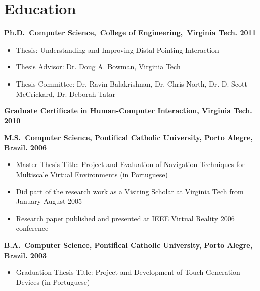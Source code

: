\documentclass[wideaddress]{vitae}
\newcommand{\VT}{Virginia Tech}
\begin{document}
\section{Education}
\begin{description}
	\item{\textbf{Ph.D.~Computer Science,~College of Engineering,~\VT. 2011}}
		\begin{itemize}
			\item{Thesis: Understanding and Improving Distal Pointing Interaction}
 			\item{Thesis Advisor: Dr. Doug A. Bowman, \VT}
	 		\item{Thesis Committee: Dr. Ravin Balakrishnan, Dr. Chris North, Dr. D. Scott McCrickard, Dr. Deborah Tatar}
		\end{itemize}
	\item{\textbf{Graduate Certificate in Human-Computer Interaction, \VT. 2010}}
 	\item{\textbf{M.S.~Computer Science, Pontifical Catholic University, Porto Alegre, Brazil. 2006}}
		 \begin{itemize}
			 \item{Master Thesis Title: Project and Evaluation of Navigation Techniques for Multiscale Virtual Environments (in Portuguese)}
			 \item{Did part of the research work as a Visiting Scholar at Virginia Tech from January-August 2005}
			 \item{Research paper published and presented at IEEE Virtual Reality 2006 conference}
		 \end{itemize}
	 \item{\textbf{B.A.~Computer Science, Pontifical Catholic University, Porto Alegre, Brazil. 2003}}
		 \begin{itemize}
			 \item{Graduation Thesis Title: Project and Development of Touch Generation Devices (in Portuguese)}
		 \end{itemize}
 \end{description}
\end{document}
